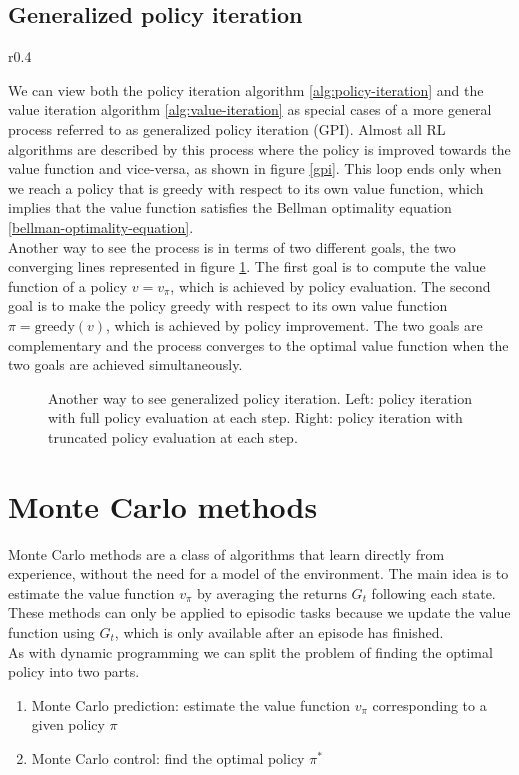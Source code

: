 \subsection{Generalized policy iteration}
\begin{wrapfigure}{r}{0.4\textwidth}
    \centering
    
    \caption{Generalized policy iteration loop}
    \label{gpi}
\end{wrapfigure} 
We can view both the policy iteration algorithm \ref{alg:policy-iteration} and the value iteration algorithm \ref{alg:value-iteration} as special cases of a more general process referred to as generalized policy iteration (GPI). Almost all RL algorithms are described by this process where the policy is improved towards the value function and vice-versa, as shown in figure \ref{gpi}. This loop ends only when we reach a policy that is greedy with respect to its own value function, which implies that the value function satisfies the Bellman optimality equation \ref{bellman-optimality-equation}.\\
Another way to see the process is in terms of two different goals, the two converging lines represented in figure \ref{gpi2}. The first goal is to compute the value function of a policy $v=v_{\pi}$, which is achieved by policy evaluation. The second goal is to make the policy greedy with respect to its own value function $\pi=\mathrm{greedy}(v)$, which is achieved by policy improvement. The two goals are complementary and the process converges to the optimal value function when the two goals are achieved simultaneously.
\begin{figure}[H]
    \centering
    
    \caption{Another way to see generalized policy iteration. Left: policy iteration with full policy evaluation at each step. Right: policy iteration with truncated policy evaluation at each step.}
    \label{gpi2}
\end{figure}

\section{Monte Carlo methods}
Monte Carlo methods are a class of algorithms that learn directly from experience, without the need for a model of the environment. The main idea is to estimate the value function $v_{\pi}$ by averaging the returns $G_t$ following each state. These methods can only be applied to episodic tasks because we update the value function using $G_t$, which is only available after an episode has finished.\\
As with dynamic programming we can split the problem of finding the optimal policy into two parts.
\begin{enumerate}
    \item Monte Carlo prediction: estimate the value function $v_{\pi}$ corresponding to a given policy $\pi$
    \item Monte Carlo control: find the optimal policy $\pi^*$
\end{enumerate}

